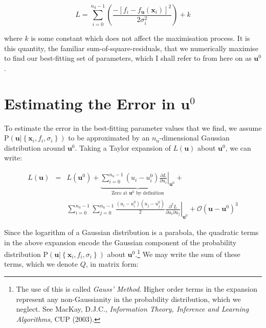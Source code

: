 \documentclass[a4paper,onecolumn,11pt]{book}
\begin{document}
\begin{equation}
L = \sum_{i=0}^{n_\mathrm{d}-1}
\left( \frac{
-\left[f_i - f_\mathbf{u}(\mathbf{x}_i)\right]^2
}{
2 \sigma_i^2
} \right) + k
\end{equation}

\noindent where $k$ is some constant which does not affect the maximisation
process. It is this quantity, the familiar sum-of-square-residuals, that we
numerically maximise to find our best-fitting set of parameters, which I shall
refer to from here on as $\mathbf{u}^0$.

\section{Estimating the Error in $\mathbf{u}^0$}

To estimate the error in the best-fitting parameter values that we find, we
assume $\mathrm{P}\left( \mathbf{u} | \left\{ \mathbf{x}_i, f_i, \sigma_i
\right\} \right)$ to be approximated by an $n_\mathrm{u}$-dimensional Gaussian
distribution around $\mathbf{u}^0$. Taking a Taylor expansion of
$L(\mathbf{u})$ about $\mathbf{u}^0$, we can write:

\begin{eqnarray}
L(\mathbf{u}) & = & L(\mathbf{u}^0) +
    \underbrace{
      \sum_{i=0}^{n_\mathrm{u}-1} \left( u_i - u^0_i \right)
      \left.\frac{\partial L}{\partial u_i}\right|_{\mathbf{u}^0}
    }_{\textrm{Zero at $\mathbf{u}^0$ by definition}} + \label{L_taylor_expand}\\
& & \sum_{i=0}^{n_\mathrm{u}-1} \sum_{j=0}^{n_\mathrm{u}-1} \frac{\left( u_i - u^0_i \right) \left( u_j - u^0_j \right)}{2}
    \left.\frac{\partial^2 L}{\partial u_i \partial u_j}\right|_{\mathbf{u}^0} +
    \mathcal{O}\left( \mathbf{u} - \mathbf{u}^0\right)^3 \nonumber
\end{eqnarray}

Since the logarithm of a Gaussian distribution is a parabola, the quadratic
terms in the above expansion encode the Gaussian component of the probability
distribution $\mathrm{P}\left( \mathbf{u} | \left\{ \mathbf{x}_i, f_i, \sigma_i
\right\} \right)$ about $\mathbf{u}^0$.\footnote{The use of this is called
\textit{Gauss' Method}. Higher order terms in the expansion represent any
non-Gaussianity in the probability distribution, which we neglect. See MacKay,
D.J.C., \textit{Information Theory, Inference and Learning Algorithms}, CUP
(2003).} We may write the sum of these terms, which we denote $Q$, in matrix
form:
\end{document}
